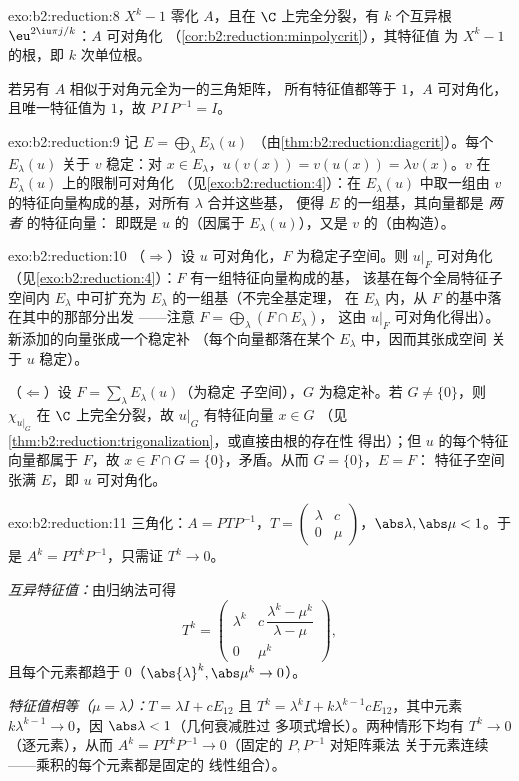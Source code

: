 \begin{solution}{exo:b2:reduction:8}
$X^k - 1$ 零化 $A$，且在 $\C$ 上完全分裂，有 $k$ 个互异根
$\eu^{2\iu\pi j/k}$：$A$ 可对角化
（\cref{cor:b2:reduction:minpolycrit}），其特征值
为 $X^k - 1$ 的根，即 $k$ 次单位根。

若另有 $A$ 相似于对角元全为一的三角矩阵，
所有特征值都等于 $1$，$A$ 可对角化，
且唯一特征值为 $1$，故 $P\,I\,P^{-1} = I$。
\end{solution}

\begin{solution}{exo:b2:reduction:9}
记 $E = \bigoplus_\lambda E_\lambda(u)$
（由\cref{thm:b2:reduction:diagcrit}）。每个 $E_\lambda(u)$
关于 $v$ 稳定：对 $x \in E_\lambda$，$u(v(x)) = v(u(x)) = \lambda
v(x)$。$v$ 在 $E_\lambda(u)$ 上的限制可对角化
（见\cref{exo:b2:reduction:4}）：在 $E_\lambda(u)$ 中取一组由
$v$ 的特征向量构成的基，对所有 $\lambda$ 合并这些基，
便得 $E$ 的一组基，其向量都是 \emph{两者} 的特征向量：
即既是 $u$ 的（因属于 $E_\lambda(u)$），又是 $v$ 的（由构造）。
\end{solution}

\begin{solution}{exo:b2:reduction:10}
（$\Rightarrow$）设 $u$ 可对角化，$F$ 为稳定子空间。则
$u|_F$ 可对角化（见\cref{exo:b2:reduction:4}）：$F$ 有一组特征向量构成的基，
该基在每个全局特征子空间内
$E_\lambda$ 中可扩充为 $E_\lambda$ 的一组基（不完全基定理，
在 $E_\lambda$ 内，从 $F$ 的基中落在其中的那部分出发
——注意 $F = \bigoplus_\lambda (F \cap E_\lambda)$，
这由 $u|_F$ 可对角化得出）。新添加的向量张成一个稳定补
（每个向量都落在某个 $E_\lambda$ 中，因而其张成空间
关于 $u$ 稳定）。

（$\Leftarrow$）设 $F = \sum_\lambda E_\lambda(u)$（为稳定
子空间），$G$ 为稳定补。若 $G \neq \{0\}$，则 $\chi_{u|_G}$
在 $\C$ 上完全分裂，故 $u|_G$ 有特征向量 $x \in G$
（见\cref{thm:b2:reduction:trigonalization}，或直接由根的存在性
得出）；但 $u$ 的每个特征向量都属于 $F$，故 $x \in F
\cap G = \{0\}$，矛盾。从而 $G = \{0\}$，$E = F$：
特征子空间张满 $E$，即 $u$ 可对角化。
\end{solution}

\begin{solution}{exo:b2:reduction:11}
三角化：$A = PTP^{-1}$，$T = \begin{pmatrix} \lambda & c\\ 0 &
\mu\end{pmatrix}$，$\abs\lambda, \abs\mu < 1$。于是 $A^k =
PT^kP^{-1}$，只需证 $T^k \to 0$。

\emph{互异特征值：}由归纳法可得
\[
T^k = \begin{pmatrix}
\lambda^k & c\,\dfrac{\lambda^k - \mu^k}{\lambda - \mu}\\[4pt]
0 & \mu^k
\end{pmatrix},
\]
且每个元素都趋于 $0$（$\abs{\lambda}^k, \abs\mu^k \to 0$）。

\emph{特征值相等（$\mu = \lambda$）：}$T = \lambda I + cE_{12}$
且 $T^k = \lambda^k I + k\lambda^{k-1}cE_{12}$，其中元素
$k\lambda^{k-1} \to 0$，因 $\abs\lambda < 1$（几何衰减胜过
多项式增长）。两种情形下均有 $T^k \to 0$（逐元素），从而 $A^k =
PT^kP^{-1} \to 0$（固定的 $P, P^{-1}$ 对矩阵乘法
关于元素连续——乘积的每个元素都是固定的
线性组合）。
\end{solution}


